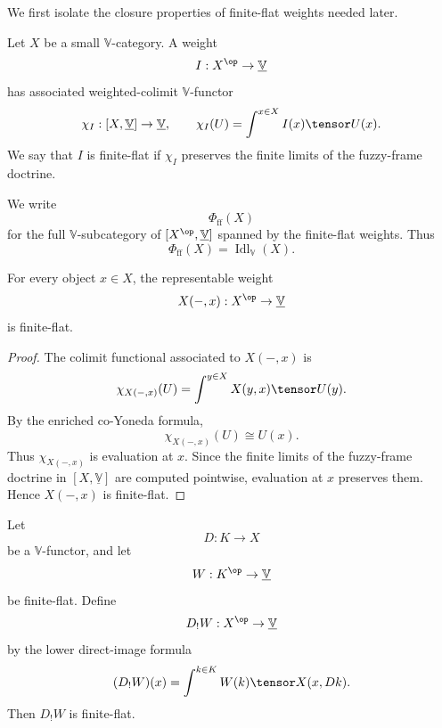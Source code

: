 We first isolate the closure properties of finite-flat weights needed later.

\begin{definition}
\label{def:finite-flat-weights-fdom}
Let \(X\) be a small \(\mathbb V\)-category.  A weight
\[
    I:X^{\op}\to\underline{\mathbb V}
\]
has associated weighted-colimit \(\mathbb V\)-functor
\[
    \chi_I:[X,\underline{\mathbb V}]\to\underline{\mathbb V},
    \qquad
    \chi_I(U)=\int^{x\in X} I(x)\tensor U(x).
\]
We say that \(I\) is finite-flat if \(\chi_I\) preserves the finite limits of
the fuzzy-frame doctrine.

We write
\[
    \Phi_{\mathrm{ff}}(X)
\]
for the full \(\mathbb V\)-subcategory of
\([X^{\op},\underline{\mathbb V}]\) spanned by the finite-flat weights.  Thus
\[
    \Phi_{\mathrm{ff}}(X)
    =
    \operatorname{Idl}_{\mathbb V}(X).
\]
\end{definition}

\begin{lemma}
\label{lem:representables-finite-flat-fdom-rewrite}
For every object \(x\in X\), the representable weight
\[
    X(-,x):X^{\op}\to\underline{\mathbb V}
\]
is finite-flat.
\end{lemma}

\begin{proof}
The colimit functional associated to \(X(-,x)\) is
\[
    \chi_{X(-,x)}(U)
    =
    \int^{y\in X}X(y,x)\tensor U(y).
\]
By the enriched co-Yoneda formula,
\[
    \chi_{X(-,x)}(U)\cong U(x).
\]
Thus \(\chi_{X(-,x)}\) is evaluation at \(x\).  Since the finite limits of the
fuzzy-frame doctrine in \([X,\underline{\mathbb V}]\) are computed pointwise,
evaluation at \(x\) preserves them.  Hence \(X(-,x)\) is finite-flat.
\end{proof}

\begin{lemma}
\label{lem:finite-flat-direct-images-fdom-rewrite}
Let
\[
    D:K\to X
\]
be a \(\mathbb V\)-functor, and let
\[
    W:K^{\op}\to\underline{\mathbb V}
\]
be finite-flat.  Define
\[
    D_!W:X^{\op}\to\underline{\mathbb V}
\]
by the lower direct-image formula
\[
    (D_!W)(x)
    =
    \int^{k\in K} W(k)\tensor X(x,Dk).
\]
Then \(D_!W\) is finite-flat.
\end{lemma}


